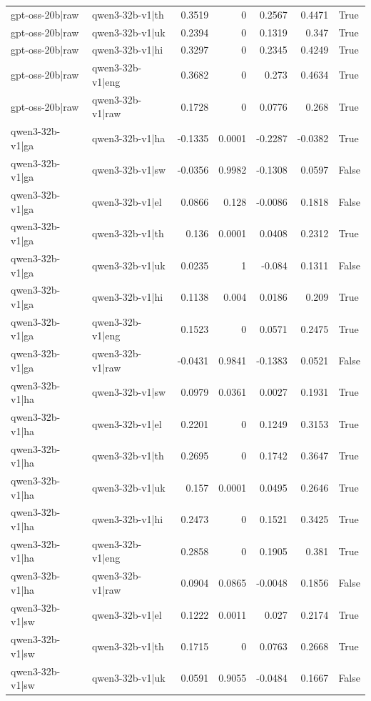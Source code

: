 \begin{table}
\begin{tabular}{l l r r r r l}
gpt-oss-20b|raw & qwen3-32b-v1|th & 0.3519 & 0 & 0.2567 & 0.4471 & True \\
gpt-oss-20b|raw & qwen3-32b-v1|uk & 0.2394 & 0 & 0.1319 & 0.347 & True \\
gpt-oss-20b|raw & qwen3-32b-v1|hi & 0.3297 & 0 & 0.2345 & 0.4249 & True \\
gpt-oss-20b|raw & qwen3-32b-v1|eng & 0.3682 & 0 & 0.273 & 0.4634 & True \\
gpt-oss-20b|raw & qwen3-32b-v1|raw & 0.1728 & 0 & 0.0776 & 0.268 & True \\
qwen3-32b-v1|ga & qwen3-32b-v1|ha & -0.1335 & 0.0001 & -0.2287 & -0.0382 & True \\
qwen3-32b-v1|ga & qwen3-32b-v1|sw & -0.0356 & 0.9982 & -0.1308 & 0.0597 & False \\
qwen3-32b-v1|ga & qwen3-32b-v1|el & 0.0866 & 0.128 & -0.0086 & 0.1818 & False \\
qwen3-32b-v1|ga & qwen3-32b-v1|th & 0.136 & 0.0001 & 0.0408 & 0.2312 & True \\
qwen3-32b-v1|ga & qwen3-32b-v1|uk & 0.0235 & 1 & -0.084 & 0.1311 & False \\
qwen3-32b-v1|ga & qwen3-32b-v1|hi & 0.1138 & 0.004 & 0.0186 & 0.209 & True \\
qwen3-32b-v1|ga & qwen3-32b-v1|eng & 0.1523 & 0 & 0.0571 & 0.2475 & True \\
qwen3-32b-v1|ga & qwen3-32b-v1|raw & -0.0431 & 0.9841 & -0.1383 & 0.0521 & False \\
qwen3-32b-v1|ha & qwen3-32b-v1|sw & 0.0979 & 0.0361 & 0.0027 & 0.1931 & True \\
qwen3-32b-v1|ha & qwen3-32b-v1|el & 0.2201 & 0 & 0.1249 & 0.3153 & True \\
qwen3-32b-v1|ha & qwen3-32b-v1|th & 0.2695 & 0 & 0.1742 & 0.3647 & True \\
qwen3-32b-v1|ha & qwen3-32b-v1|uk & 0.157 & 0.0001 & 0.0495 & 0.2646 & True \\
qwen3-32b-v1|ha & qwen3-32b-v1|hi & 0.2473 & 0 & 0.1521 & 0.3425 & True \\
qwen3-32b-v1|ha & qwen3-32b-v1|eng & 0.2858 & 0 & 0.1905 & 0.381 & True \\
qwen3-32b-v1|ha & qwen3-32b-v1|raw & 0.0904 & 0.0865 & -0.0048 & 0.1856 & False \\
qwen3-32b-v1|sw & qwen3-32b-v1|el & 0.1222 & 0.0011 & 0.027 & 0.2174 & True \\
qwen3-32b-v1|sw & qwen3-32b-v1|th & 0.1715 & 0 & 0.0763 & 0.2668 & True \\
qwen3-32b-v1|sw & qwen3-32b-v1|uk & 0.0591 & 0.9055 & -0.0484 & 0.1667 & False \\

\end{tabular}
\end{table}
